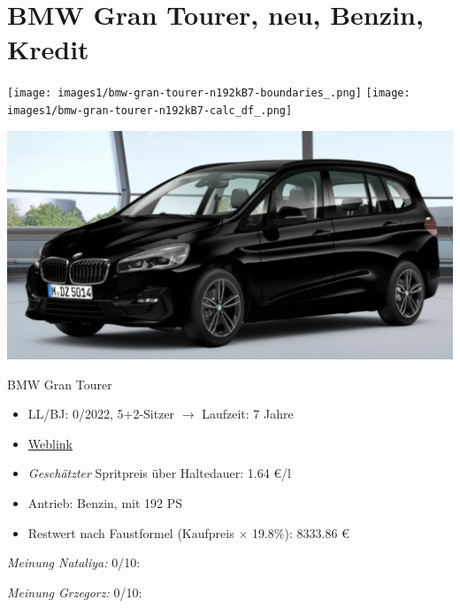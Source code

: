 \documentclass[landscape, DIV=99, 14pt]{scrartcl}
\begin{document}
\pagebreak


\twocolumn

\section*{BMW Gran Tourer, neu, Benzin, Kredit}
\begin{center}
\texttt{[image: images1/bmw-gran-tourer-n192kB7-boundaries\_.png]}
\null
\vspace{0.5cm}
\texttt{[image: images1/bmw-gran-tourer-n192kB7-calc\_df\_.png]}
\end{center}

\pagebreak
\begin{center}
\includegraphics[width=0.9\columnwidth]{cars/bmw-gran-tourer-mulfinger.png}

BMW Gran Tourer
\end{center}

\begin{itemize}
    \item LL/BJ: 0/2022, 5+2-Sitzer $\rightarrow$ Laufzeit: 7 Jahre
    \item \href{https://mulfinger.de/de/fahrzeugangebot/BMW/220i-GranTourer-Sport-DKG-HUD-LED-ParkAssNavi/page1/details-p5clkem9?manufacturer=5&model=2534&view=list}{Weblink}
    \item \emph{Gesch\"atzter} Spritpreis \"uber Haltedauer: 1.64 \euro{}/l
    \item Antrieb: Benzin, mit 192 PS
    \item Restwert nach Faustformel (Kaufpreis $\times$ 19.8\%): 8333.86 \euro{}
\end{itemize}

\begin{small}
\emph{Meinung Nataliya:} 0/10: 
        
\emph{Meinung Grzegorz:} 0/10: 
\end{small}
\end{document}
